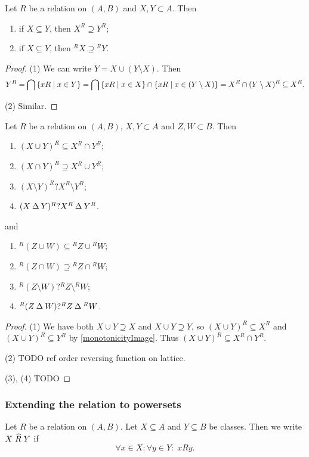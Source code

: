 \begin{corollary} \label{antitonicityPolars}
Let $R$ be a relation on $(A, B)$ and $X,Y\subset A$. Then
\begin{enumerate}
\item if $X\subseteq Y$, then $X^R \supseteq Y^R$;
\item if $X\subseteq Y$, then ${^RX} \supseteq {^RY}$.
\end{enumerate}
\end{corollary}
\begin{proof}
(1) We can write $Y = X \cup (Y\setminus X)$. Then
\[ Y^R = \bigcap \setbuilder{xR}{x\in Y} = \bigcap \setbuilder{xR}{x\in X}\cap\setbuilder{xR}{x\in (Y\setminus X)} = X^R \cap (Y\setminus X)^R \subseteq X^R. \]

(2) Similar.
\end{proof}
\begin{corollary} \label{polarasRelation}
Let $R$ be a relation on $(A, B)$, $X,Y\subset A$ and $Z,W\subset B$. Then
\begin{enumerate}
\item $(X\cup Y)^R \subseteq X^R\cap Y^R$;
\item $(X\cap Y)^R \supseteq X^R\cup Y^R$;
\item $(X\setminus Y)^R ? X^R\setminus Y^R$;
\item $(X\mathbin{\Delta} Y)^R ? X^R\mathbin{\Delta} Y^R$.
\end{enumerate}
and
\begin{enumerate}
\item $^R(Z\cup W) \subseteq {^RZ}\cup {^RW}$;
\item $^R(Z\cap W) \supseteq {^RZ}\cap {^RW}$;
\item $^R(Z\setminus W) ? {^RZ}\setminus {^RW}$;
\item $^R(Z\mathbin{\Delta} W) ? {^RZ}\mathbin{\Delta} {^RW}$.
\end{enumerate}
\end{corollary}
\begin{proof}\mbox{}
(1) We have both $X\cup Y \supseteq X$ and $X\cup Y \supseteq Y$, so $(X\cup Y)^R \subseteq X^R$ and $(X\cup Y)^R \subseteq Y^R$ by \ref{monotonicityImage}. Thus $(X\cup Y)^R \subseteq X^R\cap Y^R$.

(2) TODO ref order reversing function on lattice.

(3), (4) TODO
\end{proof}

\subsubsection{Extending the relation to powersets}
\begin{definition}
Let $R$ be a relation on $(A,B)$. Let $X\subseteq A$ and $Y\subseteq B$ be classes. Then we write $X\mathrel{\widehat{R}}Y$ if
\[ \forall x\in X: \forall y\in Y: \; xRy. \]
\end{definition}

